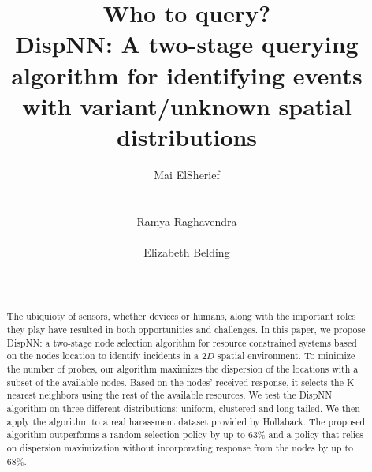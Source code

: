 \documentclass{acm_proc_article-sp}
\begin{document}
\title{Who to query? \\DispNN: A two-stage querying algorithm for identifying events with variant/unknown spatial distributions }
\author{
%
%
\alignauthor
Mai ElSherief\\
  \\
  \\
  \alignauthor
Ramya Raghavendra\\
  \\
\alignauthor
Elizabeth Belding\\
 \\
  \\
}
\maketitle
\begin{abstract}
The ubiquioty of sensors, whether devices or humans, along with the important roles they play have resulted in both opportunities and challenges. In this paper, we propose DispNN: a two-stage node selection algorithm for resource constrained systems based on the nodes location to identify incidents in a $2D$ spatial environment. To minimize the number of probes, our algorithm maximizes the dispersion of the locations with a subset of the available nodes. Based on the nodes' received response, it selects the K nearest neighbors using the rest of the available resources. We test the DispNN algorithm on three different distributions: uniform, clustered and long-tailed. We then apply the algorithm to a real harassment dataset provided by Hollaback. The proposed algorithm outperforms a random selection policy by up to $63\%$ and a policy that relies on dispersion maximization without incorporating response from the nodes by up to $68\%$.
\end{abstract}
\end{document}

